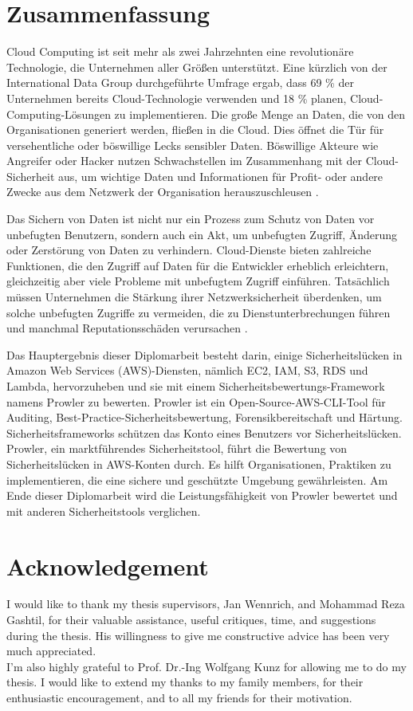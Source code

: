 \documentclass[a4paper,11pt]{report}
\begin{document}
\cleardoublepage


\section*{Zusammenfassung}
\text
Cloud Computing ist seit mehr als zwei Jahrzehnten eine revolutionäre Technologie, die Unternehmen aller Größen unterstützt.
Eine kürzlich von der International Data Group durchgeführte Umfrage ergab, dass 69 \% der Unternehmen bereits Cloud-Technologie verwenden und 18 \% planen, Cloud-Computing-Lösungen zu implementieren.
Die große Menge an Daten, die von den Organisationen generiert werden, fließen in die Cloud.
Dies öffnet die Tür für versehentliche oder böswillige Lecks sensibler Daten.
Böswillige Akteure wie Angreifer oder Hacker nutzen Schwachstellen im Zusammenhang mit der Cloud-Sicherheit aus, um wichtige Daten und Informationen für Profit- oder andere Zwecke aus dem Netzwerk der Organisation herauszuschleusen \cite{1}.


Das Sichern von Daten ist nicht nur ein Prozess zum Schutz von Daten vor unbefugten Benutzern, sondern auch ein Akt, um unbefugten Zugriff, Änderung oder Zerstörung von Daten zu verhindern.
Cloud-Dienste bieten zahlreiche Funktionen, die den Zugriff auf Daten für die Entwickler erheblich erleichtern, gleichzeitig aber viele Probleme mit unbefugtem Zugriff einführen.
Tatsächlich müssen Unternehmen die Stärkung ihrer Netzwerksicherheit überdenken, um solche unbefugten Zugriffe zu vermeiden, die zu Dienstunterbrechungen führen und manchmal Reputationsschäden verursachen \cite{1}.


Das Hauptergebnis dieser Diplomarbeit besteht darin, einige Sicherheitslücken in Amazon Web Services (AWS)-Diensten, nämlich EC2, IAM, S3, RDS und Lambda, hervorzuheben und sie mit einem Sicherheitsbewertungs-Framework namens Prowler zu bewerten.
Prowler ist ein Open-Source-AWS-CLI-Tool für Auditing, Best-Practice-Sicherheitsbewertung, Forensikbereitschaft und Härtung.
Sicherheitsframeworks schützen das Konto eines Benutzers vor Sicherheitslücken.
Prowler, ein marktführendes Sicherheitstool, führt die Bewertung von Sicherheitslücken in AWS-Konten durch.
Es hilft Organisationen, Praktiken zu implementieren, die eine sichere und geschützte Umgebung gewährleisten.
Am Ende dieser Diplomarbeit wird die Leistungsfähigkeit von Prowler bewertet und mit anderen Sicherheitstools verglichen.

\cleardoublepage

\section*{Acknowledgement}
\text I would like to thank my thesis supervisors, Jan Wennrich, and Mohammad Reza Gashtil, for their valuable assistance, useful critiques, time, and suggestions during the thesis.
His willingness to give me constructive advice has been very much appreciated.
\\
I’m also highly grateful to Prof.
Dr.-Ing Wolfgang Kunz for allowing me to do my thesis.
I would like to extend my thanks to my family members,
for their enthusiastic encouragement, and to all my
friends for their motivation.
\end{document}
